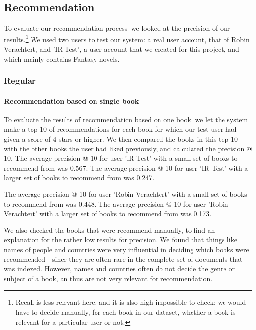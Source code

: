 \documentclass[10pt,a4paper]{paper}
\begin{document}
\subsection{Recommendation}

To evaluate our recommendation process, we looked at the precision of our results.\footnote{Recall is less relevant here, and it is also nigh impossible to check: we would have to decide manually, for each book in our dataset, whether a book is relevant for a particular user or not.} We used two users to test our system: a real user account, that of Robin Verachtert, and 'IR Test', a user account that we created for this project, and which mainly contains Fantasy novels.

\subsubsection{Regular}

\paragraph{Recommendation based on single book}
To evaluate the results of recommendation based on one book, we let the system make a top-10 of recommendations for each book for which our test user had given a score of 4 stars or higher. We then compared the books in this top-10 with the other books the user had liked previously, and calculated the precision @ 10.
The average precision @ 10 for user 'IR Test' with a small set of books to recommend from was 0.567. 
The average precision @ 10 for user 'IR Test' with a larger set of books to recommend from was 0.247.

The average precision @ 10 for user 'Robin Verachtert' with a small set of books to recommend from was 0.448. 
The average precision @ 10 for user 'Robin Verachtert' with a larger set of books to recommend from was 0.173.

We also checked the books that were recommend manually, to find an explanation for the rather low results for precision. We found that things like names of people and countries were very influential in deciding which books were recommended - since they are often rare in the complete set of documents that was indexed. However, names and countries often do not decide the genre or subject of a book, an thus are not very relevant for recommendation. 
\end{document}
